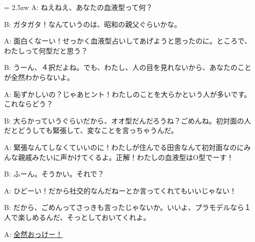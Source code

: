 \documentclass[11pt]{amsart}
\title{}
\author{}
\newenvironment{hangall}[1]{\hangindent = 2.5zw\everypar{\hangindent = 2.5zw}}{}
\begin{document}
\maketitle
\begin{hangall}{}%
A: ねえねえ、あなたの血液型って何？

B: ガタガタ！なんていうのは、昭和の親父ぐらいかな。

A: 面白くなーい！せっかく血液型占いしてあげようと思ったのに。ところで、わたしって何型だと思う？

B: うーん、４択だよね。でも、わたし、人の目を見れないから、あなたのことが全然わからないよ。

A: 恥ずかしいの？じゃあヒント！わたしのことを大らかという人が多いです。これならどう？

B: 大らかっていうぐらいだから、オオ型だんだろうね？ごめんね。初対面の人だとどうしても緊張して、変なことを言っちゃうんだ。

A: 緊張なんてしなくていいのに！わたしが住んでる田舎なんて初対面なのにみんな親戚みたいに声かけてくるよ。正解！わたしの血液型はO型でーす！

B: ふーん。そうかい。それで？

A: ひどーい！だから社交的なんだねーとか言ってくれてもいいじゃない！

B: だから、ごめんってさっきも言ったじゃないか。いいよ、プラモデルなら１人で楽しめるんだ、そっとしておいてくれよ。

A: \ul{全然おっけー！}\end{hangall}
\end{document}
